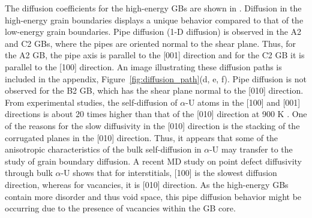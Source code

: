 \documentclass[review]{elsarticle}
\begin{document}
\par The diffusion coefficients for the high-energy GBs are shown in . Diffusion in the high-energy grain boundaries displays a unique behavior compared to that of the low-energy grain boundaries. Pipe diffusion (1-D diffusion) is observed in the A2 and C2 GBs, where the pipes are oriented normal to the shear plane. Thus, for the A2 GB, the pipe axis is parallel to the [001] direction and for the C2 GB it is parallel to the [100] direction. An image illustrating these diffusion paths is included in the appendix, Figure~\ref{fig:diffusion_path}(d, e, f). Pipe diffusion is not observed for the B2 GB, which has the shear plane normal to the [010] direction. From experimental studies, the self-diffusion of $\alpha$-U atoms in the [100] and [001] directions is about 20 times higher than that of the [010] direction at 900 K \cite{aniso_self_diff}. One of the reasons for the slow diffusivity in the [010] direction is the stacking of the corrugated planes in the [010] direction. Thus, it appears that some of the anisotropic characteristics of the bulk self-diffusion in $\alpha$-U may transfer to the study of grain boundary diffusion. A recent MD study \cite{WANG2023154289} on point defect diffusivity through bulk $\alpha$-U shows that for interstitials, [100] is the slowest diffusion direction, whereas for vacancies, it is [010] direction. As the high-energy GBs contain more disorder and thus void space, this pipe diffusion behavior might be occurring due to the presence of vacancies within the GB core.
\end{document}
